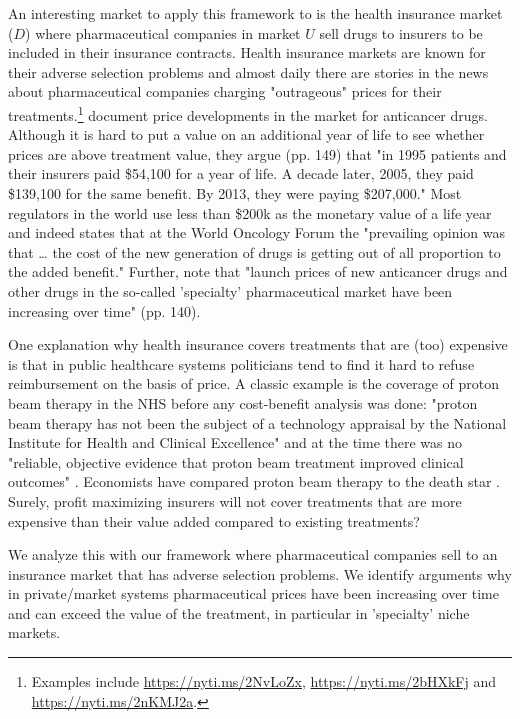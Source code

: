 \documentclass[12pt,english,a4paper]{article}
\begin{document}
An interesting market to apply this framework to is the health insurance market (\(D\)) where pharmaceutical companies in market \(U\) sell drugs to insurers to be included in their insurance contracts. Health insurance markets are known for their adverse selection problems and almost daily there are stories in the news about pharmaceutical companies charging "outrageous" prices for their treatments.\footnote{Examples include \url{https://nyti.ms/2NvLoZx}, \url{https://nyti.ms/2bHXkFj} and \url{https://nyti.ms/2nKMJ2a}.} \cite{Howard2015} document price developments in the market for anticancer drugs. Although it is hard to put a value on an additional year of life to see whether prices are above treatment value, they argue (pp. 149) that "in 1995 patients and their insurers paid \$54,100 for a year of life. A decade later, 2005, they paid \$139,100 for the same benefit. By 2013, they were paying \$207,000." Most regulators in the world use less than \$200k as the monetary value of a life year and indeed \cite{cavalli-2013-appeal-to} states that at the World Oncology Forum the "prevailing opinion was that \ldots{} the cost of the new generation of drugs is getting out of all proportion to the added benefit." Further, \cite{Howard2015} note that "launch prices of new anticancer drugs and other drugs in the so-called 'specialty' pharmaceutical market have been increasing over time" (pp. 140).

One explanation why health insurance covers treatments that are (too) expensive is that in public healthcare systems politicians tend to find it hard to refuse reimbursement on the basis of price. A classic example is the coverage of proton beam therapy in the NHS before any cost-benefit analysis was done: "proton beam therapy has not been the subject of a technology appraisal by the National Institute for Health and Clinical Excellence" and at the time there was no "reliable, objective evidence that proton beam treatment improved clinical outcomes" \citep{Hawkese2627}. Economists have compared proton beam therapy to the death star \citep{Langreth2012}. Surely, profit maximizing insurers will not cover treatments that are more expensive than their value added compared to existing treatments? 

We analyze this with our framework where pharmaceutical companies sell to an insurance market that has adverse selection problems. We identify arguments why in private/market systems pharmaceutical prices have been increasing over time and can exceed the value of the treatment, in particular in 'specialty' niche markets.
\end{document}
